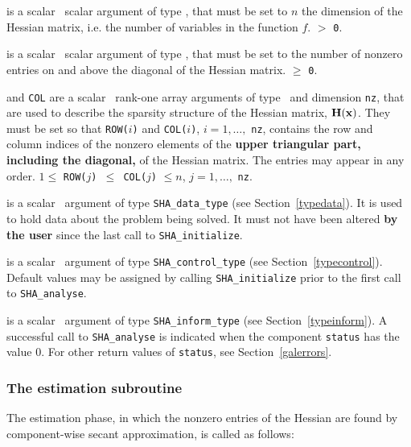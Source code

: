 \documentclass{galahad}
\newcommand{\packagename}{SHA}
\begin{document}
\vspace*{-2mm}
\begin{description}
is a scalar \intentin\ scalar argument of type \integer, that must be 
set to $n$ the dimension of the Hessian matrix, i.e. the number of
variables in the function $f$. 
 $>$ {\tt 0}.

is a scalar \intentin\ scalar argument of type \integer, that must be
set to the number of nonzero entries on and above the diagonal of the Hessian
matrix.
 $\ge$ {\tt 0}.

 and {\tt COL} are a scalar \intentin\ rank-one array arguments 
of type  \integer\ and dimension {\tt nz}, that are used to describe 
the sparsity structure of the Hessian matrix, ${\mathbf{H}}({\mathbf{x}})$. 
They must be set so that
{\tt ROW(}$i${\tt)} and {\tt COL(}$i${\tt)}, $i = 1, \ldots,$ {\tt nz},
contains the row and column indices of the nonzero elements of the 
{\bf upper triangular part, including the diagonal,} of the Hessian matrix.
The entries may appear in any order.
\restrictions 
$1 \leq$ {\tt ROW(}$j${\tt) $\leq$ COL(}$j${\tt)} $\leq n$, 
$j = 1, \ldots,$ {\tt nz}.

 is a scalar \intentinout\ argument of type 
{\tt \packagename\_data\_type}
(see Section~\ref{typedata}). It is used to hold data about the problem being 
solved. It must not have been altered {\bf by the user} since the last call to 
{\tt \packagename\_initialize}.

 is a scalar \intentin\ argument of type 
{\tt \packagename\_control\_type}
(see Section~\ref{typecontrol}). Default values may be assigned by calling 
{\tt \packagename\_initialize} prior to the first call to 
{\tt \packagename\_analyse}. 

 is a scalar \intentinout\ argument of type 
{\tt \packagename\_inform\_type}
(see Section~\ref{typeinform}). 
A successful call to
{\tt \packagename\_analyse}
is indicated when the  component {\tt status} has the value 0. 
For other return values of {\tt status}, see Section~\ref{galerrors}.

\end{description}


\subsubsection{The estimation subroutine}
The estimation phase, in which the nonzero entries of the Hessian
are found by component-wise secant approximation, is called as follows:
\vspace*{1mm}
\end{document}
